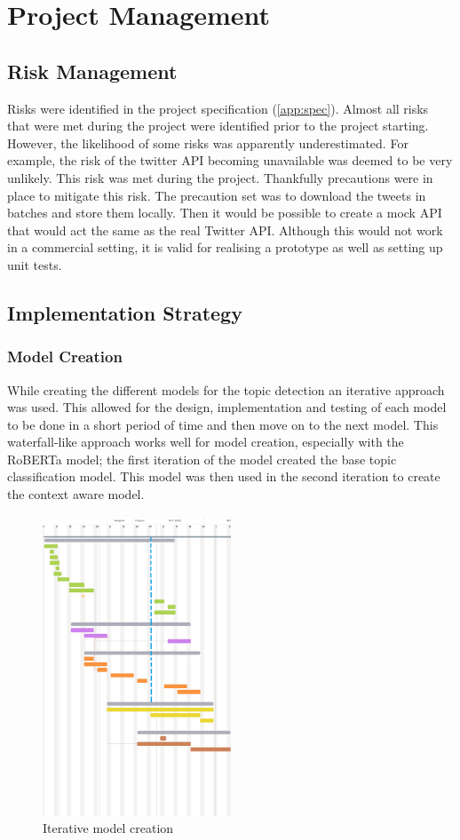 \chapter{Project Management}
\label{ch:pm}
\section{Risk Management}
Risks were identified in the project specification (\cref{app:spec}). Almost all risks that were met during the project were identified
prior to the project starting. However, the likelihood of some risks was apparently underestimated. For example, the risk of the 
twitter API becoming unavailable was deemed to be very unlikely. This risk was met during the project. Thankfully precautions were
in place to mitigate this risk. The precaution set was to download the tweets in batches and store them locally. Then it would be
possible to create a mock API that would act the same as the real Twitter API. Although this would not work in a commercial setting, it
is valid for realising a prototype as well as setting up unit tests.
\section{Implementation Strategy}
\subsection{Model Creation}
While creating the different models for the topic detection an iterative approach was used. This allowed for the design, implementation and testing
of each model to be done in a short period of time and then move on to the next model. This waterfall-like approach works well for model creation,
especially with the RoBERTa model; the first iteration of the model created the base topic classification model. This model was then used
in the second iteration to create the context aware model.
\begin{figure}[hbtp]
    \centering
    \includegraphics[width=0.5\textwidth]{../images/3yp timeline pres.png}
    \caption{Iterative model creation}
    \label{fig:iterative-model-creation}
\end{figure}

